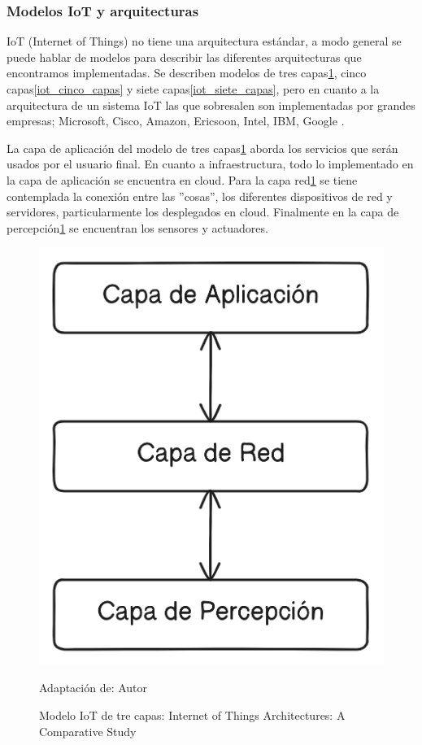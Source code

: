 \documentclass[stu,12pt,floatsintext]{apa7}
\begin{document}
	\subsubsection{Modelos IoT y arquitecturas}
	IoT (Internet of Things) no tiene una arquitectura estándar, a modo general se puede hablar de modelos para describir las diferentes arquitecturas que encontramos implementadas. Se describen modelos de tres capas\ref{iot_tres_capas}, cinco capas\ref{iot_cinco_capas} y siete capas\ref{iot_siete_capas}, pero en cuanto a la arquitectura de un sistema IoT las que sobresalen son implementadas por grandes empresas; Microsoft, Cisco, Amazon, Ericsoon, Intel, IBM, Google \cite{DBLP:journals/corr/abs-2004-12936}.
	
	La capa de aplicación del modelo de tres capas\ref{iot_tres_capas} aborda los servicios que serán usados por el usuario final. En cuanto a infraestructura, todo lo implementado en la capa de aplicación se encuentra en cloud.
	Para la capa red\ref{iot_tres_capas} se tiene contemplada la conexión entre las ''cosas'', los diferentes dispositivos de red y servidores, particularmente los desplegados en cloud.
	Finalmente en la capa de percepción\ref{iot_tres_capas} se encuentran los sensores y actuadores.
		\begin{figure}[H]
		\centering
		\includegraphics[scale=0.3]{iot_modelo_3_capas}
		\captionsetup{justification=centering}
		\caption{Modelo IoT de tre capas: Internet of Things Architectures: A Comparative Study}
		\small
		\label{iot_tres_capas}
		Adaptación de: Autor
	\end{figure}
	
\end{document}
